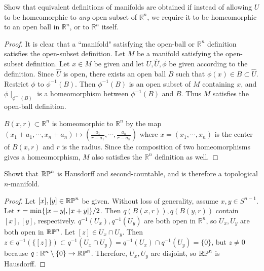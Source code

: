 \begin{customexer}{1.1}
  Show that equivalent definitions of manifolds are obtained if instead of allowing $U$ to be homeomorphic to \textit{any} open subset of $\mathbb{R}^n$, we require it to be homeomorphic to an open ball in $\mathbb{R}^n$, or to $\mathbb{R}^n$ itself.
\end{customexer}

\begin{proof}
  It is clear that a ``manifold" satisfying the open-ball or $\mathbb{R}^n$ definition satisfies the open-subset definition.
  Let $M$ be a manifold satisfying the open-subset definition.
  Let $x \in M$ be given and let $U, \hat{U}, \phi$ be given according to the definition.
  Since $\hat{U}$ is open, there exists an open ball $B$ such that $\phi(x) \in B \subset \hat{U}$.
  Restrict $\phi$ to $\phi^{-1}(B)$.
  Then $\phi^{-1}(B)$ is an open subset of $M$ containing $x$, and $\phi\mid_{\phi^{-1}(B)}$ is a homeomorphism between $\phi^{-1}(B)$ and $B$.
  Thus $M$ satisfies the open-ball definition.

  $B(x, r) \subset \mathbb{R}^n$ is homeomorphic to $\mathbb{R}^n$ by the map $(x_1 + a_1, \cdots, x_n + a_n) \mapsto (\frac{a_1}{r - a_1}, \cdots, \frac{a_n}{r - a_n})$ where $x = (x_1, \cdots, x_n)$ is the center of $B(x, r)$ and $r$ is the radius.
  Since the composition of two homeomorphisms gives a homeomorphism, $M$ also satisfies the $\mathbb{R}^n$ definition as well.
\end{proof}


\begin{customexer}{1.6}
  Showt that $\operatorname{\mathbb{R}\mathbb{P}}^n$ is Hausdorff and second-countable, and is therefore a topological $n$-manifold.
\end{customexer}

\begin{proof}
  Let $[x], [y] \in \operatorname{\mathbb{R}\mathbb{P}}^n$ be given.
  Without loss of generality, assume $x, y \in S^{n - 1}$.
  Let $r = \min\{ \abs{x - y}, \abs{x + y} \} / 2$.
  Then $q(B(x, r)), q(B(y, r))$ contain $[x], [y]$, respectively.
  $q^{-1}(U_x), q^{-1}(U_y)$ are both open in $\mathbb{R}^n$, so $U_x, U_y$ are both open in $\operatorname{\mathbb{R}\mathbb{P}}^n$.
  Let $[z] \in U_x \cap U_y$.
  Then $z \in q^{-1}(\{ [z] \}) \subset q^{-1}(U_x \cap U_y) = q^{-1}(U_x) \cap q^{-1}(U_y) = \{ 0 \}$, but $z \ne 0$ because $q: \mathbb{R}^n \setminus \{ 0 \} \rightarrow \operatorname{\mathbb{R}\mathbb{P}}^n$.
  Therefore, $U_x, U_y$ are disjoint, so $\operatorname{\mathbb{R}\mathbb{P}}^n$ is Hausdorff.

\end{proof}
